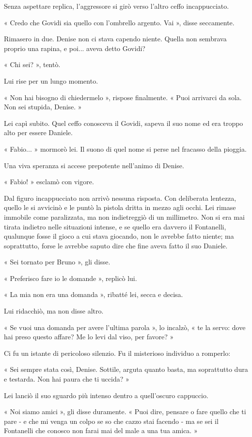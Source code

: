 Senza aspettare replica, l'aggressore si girò verso l'altro ceffo incappucciato.

« Credo che Govidi sia quello con l'ombrello argento. Vai », disse seccamente.

Rimasero in due. Denise non ci stava capendo niente. Quella non sembrava proprio una rapina, e poi... aveva detto Govidi?

« Chi sei? », tentò.

Lui rise per un lungo momento.

« Non hai bisogno di chiedermelo », rispose finalmente. « Puoi arrivarci da sola. Non sei stupida, Denise. »

Lei capì subito. Quel ceffo conosceva il Govidi, sapeva il suo nome ed era troppo alto per essere Daniele.

« Fabio... » mormorò lei. Il suono di quel nome si perse nel fracasso della pioggia.

Una viva speranza si accese prepotente nell'animo di Denise.

« Fabio! » esclamò con vigore.

Dal figuro incappucciato non arrivò nessuna risposta. Con deliberata lentezza, quello le si avvicinò e le puntò la pistola dritta in mezzo agli occhi. Lei rimase immobile come paralizzata, ma non indietreggiò di un millimetro. Non si era mai tirata indietro nelle situazioni intense, e se quello era davvero il Fontanelli, qualunque fosse il gioco a cui stava giocando, non le avrebbe fatto niente; ma soprattutto, forse le avrebbe saputo dire che fine aveva fatto il suo Daniele.

« Sei tornato per Bruno », gli disse.

« Preferisco fare io le domande », replicò lui.

« La mia non era una domanda », ribatté lei, secca e decisa.

Lui ridacchiò, ma non disse altro.

« Se vuoi una domanda per avere l'ultima parola », lo incalzò, « te la servo: dove hai preso questo affare? Me lo levi dal viso, per favore? »

Ci fu un istante di pericoloso silenzio. Fu il misterioso individuo a romperlo:

« Sei sempre stata così, Denise. Sottile, arguta quanto basta, ma soprattutto dura e testarda. Non hai paura che ti uccida? »

Lei lanciò il suo sguardo più intenso dentro a quell'oscuro cappuccio.

« Noi siamo amici », gli disse duramente. « Puoi dire, pensare o fare quello che ti pare - e che mi venga un colpo se so che cazzo stai facendo - ma se sei il Fontanelli che conosco non farai mai del male a una tua amica. »


